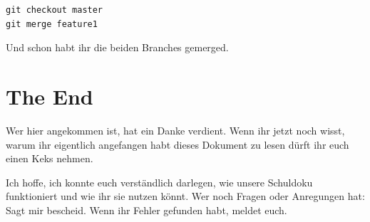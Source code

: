 \documentclass[a4paper,11pt]{scrartcl}	%
\begin{document}
		\begin{lstlisting}[frame=single]
git checkout master
git merge feature1
		\end{lstlisting}

	Und schon habt ihr die beiden Branches gemerged.

\section{The End}

Wer hier angekommen ist, hat ein Danke verdient. Wenn ihr jetzt noch wisst, warum ihr eigentlich angefangen habt dieses Dokument
zu lesen dürft ihr euch einen Keks nehmen.\par
Ich hoffe, ich konnte euch verständlich darlegen, wie unsere Schuldoku funktioniert und wie ihr sie nutzen könnt.
Wer noch Fragen oder Anregungen hat: Sagt mir bescheid. Wenn ihr Fehler gefunden habt, meldet euch.
\end{document}
